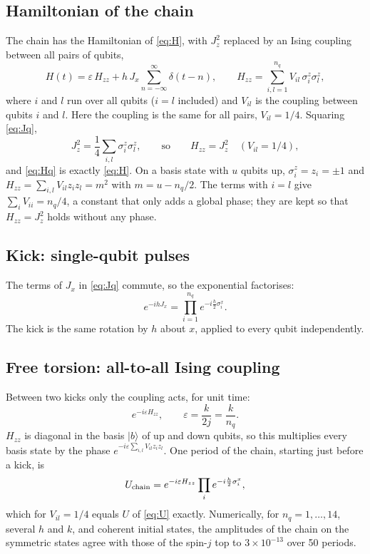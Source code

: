 \documentclass[11pt,a4paper]{article}
\begin{document}
\subsection{Hamiltonian of the chain}

The chain has the Hamiltonian of \cref{eq:H}, with $J_z^2$ replaced by an Ising coupling between all pairs of qubits,
\begin{equation}\label{eq:Hq}
  H(t) = \varepsilon\,H_{zz} + h\,J_x\sum_{n=-\infty}^{\infty}\delta(t-n),\qquad
  H_{zz} = \sum_{i,l=1}^{n_q} V_{il}\,\sigma^z_i\sigma^z_l ,
\end{equation}
where $i$ and $l$ run over all qubits ($i=l$ included) and $V_{il}$ is the coupling between qubits $i$ and $l$. Here
the coupling is the same for all pairs, $V_{il}=1/4$. Squaring \cref{eq:Jq},
\begin{equation}\label{eq:Hzz}
  J_z^2 = \frac14\sum_{i,l}\sigma^z_i\sigma^z_l ,\qquad\text{so}\qquad H_{zz} = J_z^2 \quad (V_{il}=1/4),
\end{equation}
and \cref{eq:Hq} is exactly \cref{eq:H}. On a basis state with $u$ qubits up, $\sigma^z_i=z_i=\pm1$ and
$H_{zz}=\sum_{i,l}V_{il}z_iz_l = m^2$ with $m=u-n_q/2$. The terms with $i=l$ give $\sum_iV_{ii}=n_q/4$, a constant
that only adds a global phase; they are kept so that $H_{zz}=J_z^2$ holds without any phase.

\subsection{Kick: single-qubit pulses}

The terms of $J_x$ in \cref{eq:Jq} commute, so the exponential factorises:
\begin{equation}
  e^{-ihJ_x} = \prod_{i=1}^{n_q} e^{-i\frac h2\sigma^x_i}.
\end{equation}
The kick is the same rotation by $h$ about $x$, applied to every qubit independently.

\subsection{Free torsion: all-to-all Ising coupling}

Between two kicks only the coupling acts, for unit time:
\begin{equation}\label{eq:torq}
  e^{-i\varepsilon H_{zz}} ,\qquad \varepsilon = \frac{k}{2j} = \frac{k}{n_q}.
\end{equation}
$H_{zz}$ is diagonal in the basis $|b\rangle$ of up and down qubits, so this multiplies every basis state by the phase
$e^{-i\varepsilon\sum_{i,l}V_{il}z_iz_l}$. One period of the chain, starting just before a kick, is
\begin{equation}\label{eq:Uq}
  U_{\rm chain} = e^{-i\varepsilon H_{zz}}\prod_{i}e^{-i\frac h2\sigma^x_i} ,
\end{equation}
which for $V_{il}=1/4$ equals $U$ of \cref{eq:U} exactly. Numerically, for $n_q=1,\dots,14$, several $h$ and $k$, and
coherent initial states, the amplitudes of the chain on the symmetric states agree with those of the spin-$j$ top to
$3\times10^{-13}$ over 50 periods.
\end{document}
